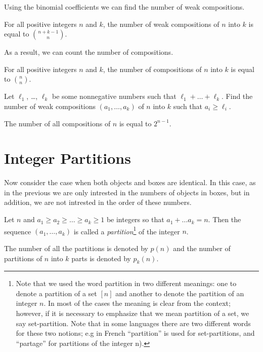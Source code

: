 Using the binomial coefficients we can find the number of weak
compositions.
\begin{theorem}
  For all positive integers $n$ and $k$,
  the number of weak compositions of $n$ into $k$ is equal to
  $\binom{n + k - 1}{n}$.
\end{theorem}

As a result, we can count the number of compositions.
\begin{corollary}
  For all positive integers $n$ and $k$,
  the number of compositions of $n$ into $k$ is equal to
  $\binom{n}{n}$.
\end{corollary}

\begin{exercise}
  Let $\ell_1$, \dots, $\ell_k$ be some nonnegative numbers
  such that $\ell_1 + \dots + \ell_k$.
  Find the number of weak compositions $(a_1, \dots, a_k)$
  of $n$ into $k$ such that $a_i \ge \ell_i$.
\end{exercise}

\begin{corollary}
  The number of all compositions of $n$ is equal to $2^{n - 1}$.
\end{corollary}

\section{Integer Partitions}
Now consider the case when both objects and boxes are identical. In this case,
as in the previous we are only intrested in the numbers of objects in boxes, but
in addition, we are not intrested in the order of these numbers.

\begin{definition}
  Let $n$ and $a_1 \ge a_2 \ge \dots \ge a_k \ge 1$ be integers so that
  $a_1 + \dots a_k = n$. Then the sequence $(a_1, \dots, a_k)$ is called
  a \emph{partition}\footnote{%
    Note that we used the word partition in two different meanings: one to
    denote a partition of a set $[n]$ and another to denote the partition of
    an integer $n$. In most of the cases the meaning is clear from the context;
    however, if it is necessary to emphasize that we mean partition of a set,
    we say set-partition. Note that in some languages there are two different
    words for these two notions; e.g in French ``partition'' is used for
    set-partitions, and ``partage'' for partitions of the integer n).
  } of the integer $n$.

  The number of all the partitions is denoted by $p(n)$ and the number of
  partitions of $n$ into $k$ parts is denoted by $p_k(n)$.
\end{definition}

